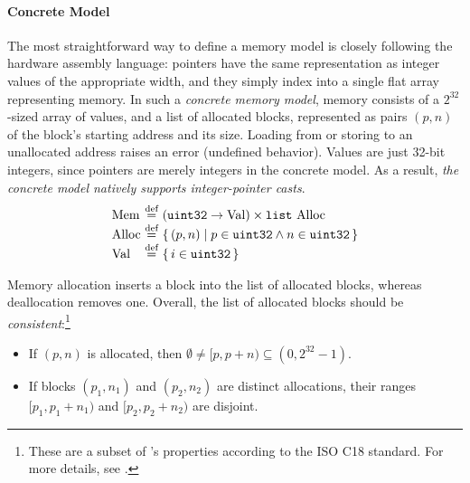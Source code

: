 



\paragraph{Concrete Model}

The most straightforward way to define a memory model is closely following the hardware assembly
language: pointers have the same representation as integer values of the appropriate width, and they
simply index into a single flat array representing memory.  In such a \emph{concrete memory model},
memory consists of a $2^{32}$-sized array of values, and a list of allocated blocks, represented as
pairs $(p,n)$ of the block's starting address and its size.  Loading from or storing to an
unallocated address raises an error (\ie undefined behavior).  Values are just 32-bit integers,
since pointers are merely integers in the concrete model.  As a result, \emph{the concrete model
  natively supports integer-pointer casts}.
\[
\begin{array}{@{}l@{~}c@{~}l@{}}
\mathrm{Mem} &\defeq& (\usize \to \rtlVal) \times \mathtt{list}\ \mathrm{Alloc} \\
\mathrm{Alloc} &\defeq& \setof{(p,n) \suchthat p \in \usize \land n \in \usize} \\
\rtlVal &\defeq& \setof{i\in\usize}
\end{array}
\]

Memory allocation inserts a block into the list of allocated blocks, whereas deallocation removes
one.  Overall, the list of allocated blocks should be \emph{consistent}:\footnote{These are a subset
  of 's properties according to the ISO C18 standard.  For more details, see
  \cite[\S7.22.3p1 and \S6.5.8p5]{c18}.}
\begin{itemize}
\item If $(p, n)$ is allocated, then $\emptyset \neq [p,p+n) \subseteq
  (0,2^{32}-1)$.
\item If blocks $(p_1, n_1)$ and $(p_2, n_2)$ are distinct
  allocations, their ranges $[p_1,p_1+n_1)$ and $[p_2,p_2+n_2)$
  are disjoint.
\end{itemize}

